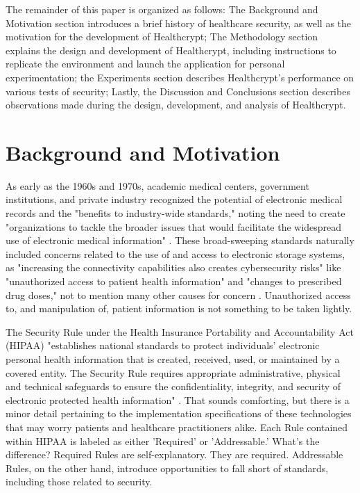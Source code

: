 \documentclass[letterpaper, 10pt,DIV=13]{scrartcl}
\begin{document}
\begin{multicols}{2}
\begin{spacing}{1.25}
The remainder of this paper is organized as follows: The Background and Motivation section introduces a brief history of healthcare security, as well as the motivation for the development of Healthcrypt; The Methodology section explains the design and development of Healthcrypt, including instructions to replicate the environment and launch the application for personal experimentation; the Experiments section describes Healthcrypt's performance on various tests of security; Lastly, the Discussion and Conclusions section describes observations made during the design, development, and analysis of Healthcrypt.
\end{spacing}

\vspace{-2.5pt}

\section*{Background and Motivation}
\begin{spacing}{1.25}
As early as the 1960s and 1970s, academic medical centers, government institutions, and private industry recognized the potential of electronic medical records and the "benefits to industry-wide standards," noting the need to create "organizations to tackle the broader issues that would facilitate the widespread use of electronic medical information" \cite{ehrhistory2011}. These broad-sweeping standards naturally included concerns related to the use of and access to electronic storage systems, as "increasing the connectivity capabilities also creates cybersecurity risks" like "unauthorized access to patient health information" and "changes to prescribed drug doses," not to mention many other causes for concern \cite{nistitl2017}. Unauthorized access to, and manipulation of, patient information is not something to be taken lightly.

The Security Rule under the Health Insurance Portability and Accountability Act (HIPAA) "establishes national standards to protect individuals’ electronic personal health information that is created, received, used, or maintained by a covered entity. The Security Rule requires appropriate administrative, physical and technical safeguards to ensure the confidentiality, integrity, and security of electronic protected health information" \cite{hippaprof2017}. That sounds comforting, but there is a minor detail pertaining to the implementation specifications of these technologies that may worry patients and healthcare practitioners alike. Each Rule contained within HIPAA is labeled as either 'Required' or 'Addressable.' What's the difference? Required Rules are self-explanatory. They are required. Addressable Rules, on the other hand, introduce opportunities to fall short of standards, including those related to security.


\end{spacing}
\end{multicols}
\end{document}
